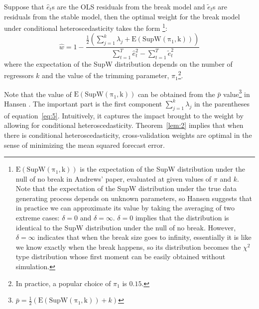 \begin{theorem} \label{lem:2}
Suppose that $\hat{e}_t$s are the OLS residuals from the break model and $\tilde{e}_t$s are residuals from the stable model, then the optimal weight for the break model under conditional heteroscedasticity takes the form \footnote{$\mathrm{E(SupW(\pi_1,k))}$ is the expectation of the SupW distribution under the null of no break in Andrews' paper, evaluated at given values of $\pi$ and $k$. Note that the expectation of the SupW distribution under the true data generating process depends on unknown parameters, so Hansen suggests that in practice we can approximate its value by taking the averaging of two extreme cases: $\delta = 0$ and $\delta = \infty$. $\delta = 0$ implies that the distribution is identical to the SupW distribution under the null of no break. However, $\delta = \infty$ indicates that when the break size goes to infinity, essentially it is like we know exactly when the break happens, so its distribution becomes the $\chi^2$ type distribution whose first moment can be easily obtained without simulation.}:
\begin{equation} \label{eq:5}
	\hat{w} = 1 - \frac{\frac{1}{2}(\sum_{j=1}^{k}\lambda_j + \mathrm{E(SupW(\pi_1,k))})}{\sum_{t=1}^{T}\hat{e}_t^2 - \sum_{t=1}^{T}\tilde{e}_t^2}
\end{equation}
where the expectation of the SupW distribution depends on the number of regressors $k$ and the value of the trimming parameter, $\pi_1$\footnote{In practice, a popular choice of $\pi_1$ is $0.15$.}.
\end{theorem}
Note that the value of $\mathrm{E(SupW(\pi_1,k))}$ can be obtained from the $\bar{p}$ value\footnote{$\bar{p} = \frac{1}{2}(\mathrm{E(SupW(\pi_1,k))} + k)$} in Hansen \cite{hansen2009averaging}. The important part is the first component $\sum_{j=1}^{k}\lambda_j$ in the parentheses of equation~\ref{eq:5}. Intuitively, it captures the impact brought to the weight by allowing for conditional heteroscedasticity. Theorem~\ref{lem:2} implies that when there is conditional heteroscedasticity, cross-validation weights are optimal in the sense of minimizing the mean squared forecast error. 